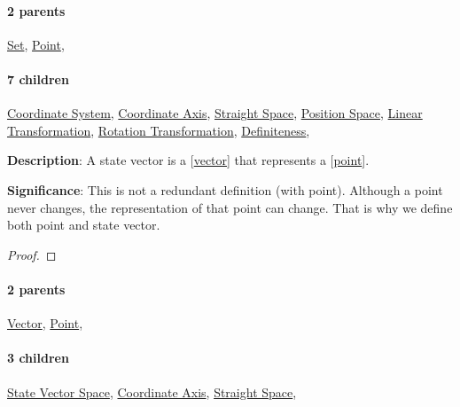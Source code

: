 \documentclass[../main.tex]{subfiles}
\begin{document}
\paragraph{2 parents} \hyperref[statement:Set]{Set}, \hyperref[statement:Point]{Point}, 
\paragraph{7 children} \hyperref[statement:Coordinate System]{Coordinate System}, \hyperref[statement:Coordinate Axis]{Coordinate Axis}, \hyperref[statement:Straight Space]{Straight Space}, \hyperref[statement:Position Space]{Position Space}, \hyperref[statement:Linear Transformation]{Linear Transformation}, \hyperref[statement:Rotation Transformation]{Rotation Transformation}, \hyperref[statement:Definiteness]{Definiteness}, 



\begin{statement}
\label{statement:State Vector}\hspace*{0pt}\par
\end{statement}
\textbf{Description}:
A state vector is a [\hyperref[statement:Vector]{vector}] that represents a [\hyperref[statement:Point]{point}].
\par
{\color{magenta} \textbf{Significance}:
This is not a redundant definition (with point).
Although a point never changes, the representation of that point can change.
That is why we define both point and state vector.
\par}
\begin{proof}
\proofbydefinition
\end{proof}\par
\paragraph{2 parents} \hyperref[statement:Vector]{Vector}, \hyperref[statement:Point]{Point}, 
\paragraph{3 children} \hyperref[statement:State Vector Space]{State Vector Space}, \hyperref[statement:Coordinate Axis]{Coordinate Axis}, \hyperref[statement:Straight Space]{Straight Space}, 
\end{document}
